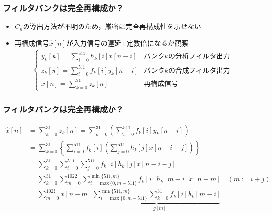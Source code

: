 \documentclass[14pt,xcolor=dvipsnames,table,dvipdfmx]{beamer}
\begin{document}
\begin{frame}[c]
    \frametitle{フィルタバンクは完全再構成か？}
    \begin{itemize}
        \item $C_{n}$の導出方法が不明のため，厳密に完全再構成性を示せない
        \item 再構成信号$\hat{x}[n]$が入力信号の遅延+定数倍になるか観察
            \small
            \begin{align*}
                \left\{ \begin{array}{ll}
                    y_{k}[n] = \displaystyle\sum_{i = 0}^{511} h_{k}[i] x[n - i] & \text{バンク$k$の分析フィルタ出力} \\
                    z_{k}[n] = \displaystyle\sum_{i = 0}^{511} f_{k}[i] y_{k}[n - i] & \text{バンク$k$の合成フィルタ出力} \\
                    \hat{x}[n] = \displaystyle\sum_{k = 0}^{31} z_{k}[n] & \text{再構成信号} 
                \end{array} \right.
            \end{align*}
    \end{itemize}
\end{frame}

\begin{frame}[c]
    \frametitle{フィルタバンクは完全再構成か？}
    \small
    \vspace{-10pt}
    \begin{align*}
        \hat{x}[n] &= \sum_{k = 0}^{31} z_{k}[n] = \sum_{k = 0}^{31} \left( \sum_{i = 0}^{511} f_{k}[i] y_{k}[n - i] \right) \\
        &= \sum_{k = 0}^{31} \left\{ \sum_{i = 0}^{511} f_{k}[i] \left( \sum_{j = 0}^{511} h_{k}[j] x[n - i - j] \right) \right\} \\
        &= \sum_{k = 0}^{31} \sum_{i = 0}^{511} \sum_{j = 0}^{511} f_{k}[i] h_{k}[j] x[n - i - j] \\
        &= \sum_{k = 0}^{31} \sum_{m = 0}^{1022} \sum_{i = \max\{ 0, m-511 \}}^{\min\{ 511, m \}} f_{k}[i] h_{k}[m - i] x[n - m] \quad (m := i + j) \\
        &= \sum_{m = 0}^{1022} x[n - m] \underbrace{\sum_{i = \max\{ 0, m-511 \}}^{\min\{ 511, m \}} \sum_{k = 0}^{31} f_{k}[i] h_{k}[m - i]}_{=g[m]}
    \end{align*}
\end{frame}
\end{document}
